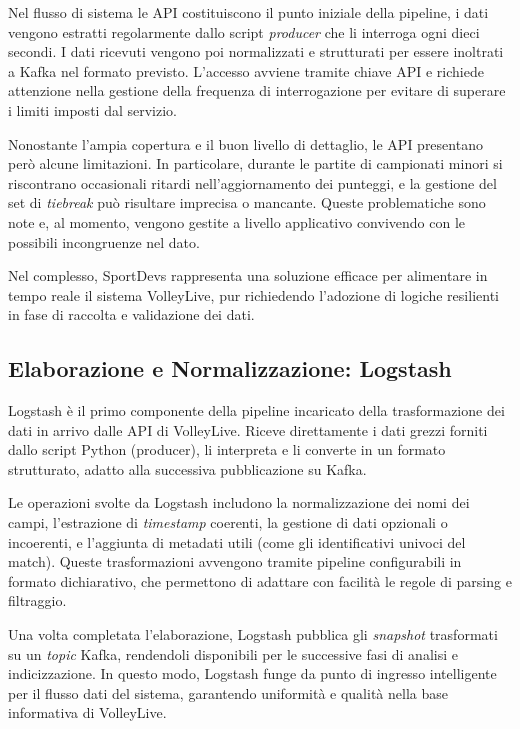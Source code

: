 \documentclass[a4paper,12pt]{report}
\begin{document}
Nel flusso di sistema le API costituiscono il punto iniziale della pipeline, i dati vengono estratti regolarmente dallo script \textit{producer} che li interroga ogni dieci secondi. I dati ricevuti vengono poi normalizzati e strutturati per essere inoltrati a Kafka nel formato previsto. L'accesso avviene tramite chiave API e richiede attenzione nella gestione della frequenza di interrogazione per evitare di superare i limiti imposti dal servizio.

Nonostante l’ampia copertura e il buon livello di dettaglio, le API presentano però alcune limitazioni. In particolare, durante le partite di campionati minori si riscontrano occasionali ritardi nell’aggiornamento dei punteggi, e la gestione del set di \textit{tiebreak} può risultare imprecisa o mancante. Queste problematiche sono note e, al momento, vengono gestite a livello applicativo convivendo con le possibili incongruenze nel dato.

Nel complesso, SportDevs rappresenta una soluzione efficace per alimentare in tempo reale il sistema VolleyLive, pur richiedendo l’adozione di logiche resilienti in fase di raccolta e validazione dei dati.

\subsection{Elaborazione e Normalizzazione: Logstash}

Logstash è il primo componente della pipeline incaricato della trasformazione dei dati in arrivo dalle API di VolleyLive. Riceve direttamente i dati grezzi forniti dallo script Python (producer), li interpreta e li converte in un formato strutturato, adatto alla successiva pubblicazione su Kafka.

Le operazioni svolte da Logstash includono la normalizzazione dei nomi dei campi, l’estrazione di \textit{timestamp} coerenti, la gestione di dati opzionali o incoerenti, e l’aggiunta di metadati utili (come gli identificativi univoci del match). Queste trasformazioni avvengono tramite pipeline configurabili in formato dichiarativo, che permettono di adattare con facilità le regole di parsing e filtraggio.

Una volta completata l’elaborazione, Logstash pubblica gli \textit{snapshot} trasformati su un \textit{topic} Kafka, rendendoli disponibili per le successive fasi di analisi e indicizzazione. In questo modo, Logstash funge da punto di ingresso intelligente per il flusso dati del sistema, garantendo uniformità e qualità nella base informativa di VolleyLive.
\end{document}
